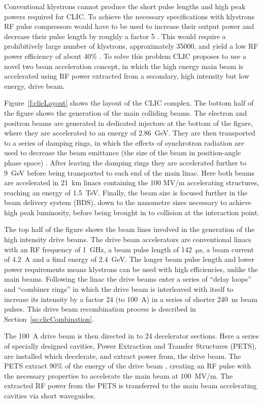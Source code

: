 Conventional klystrons cannot produce the short pulse lengths and high peak powers required for CLIC. To achieve the necessary specifications with klystrons RF pulse compressors would have to be used to increase their output power and decrease their pulse length by roughly a factor 5 \cite{clicCDR}. This would require a prohibitively large number of klystrons, approximately 35000, and yield a low RF power efficiency of about 40\% \cite{clicCDR}. To solve this problem CLIC proposes to use a novel two beam acceleration concept, in which the high energy main beam is accelerated using RF power extracted from a secondary, high intensity but low energy, drive beam.

Figure~\ref{f:clicLayout} shows the layout of the CLIC complex. The bottom half of the figure shows the generation of the main colliding beams. The electron and positron beams are generated in dedicated injectors at the bottom of the figure, where they are accelerated to an energy of 2.86~GeV. They are then transported to a series of damping rings, in which the effects of synchrotron radiation are used to decrease the beam emittance (the size of the beam in position-angle phase space) \cite{dampRings}. After leaving the damping rings they are accelerated further to 9~GeV before being transported to each end of the main linac. Here both beams are accelerated in 21~km linacs containing the 100 MV/m accelerating structures, reaching an energy of 1.5~TeV. Finally, the beam size is focused further in the beam delivery system (BDS), down to the nanometre sizes necessary to achieve high peak luminosity, before being brought in to collision at the interaction point.

The top half of the figure shows the beam lines involved in the generation of the high intensity drive beams. The drive beam accelerators are conventional linacs with an RF frequency of 1~GHz, a beam pulse length of 142~\(\mathrm{\mu s}\), a beam current of 4.2~A and a final energy of 2.4~GeV. The longer beam pulse length and lower power requirements means klystrons can be used with high efficiencies, unlike the main beams. Following the linac the drive beams enter a series of ``delay loops'' and ``combiner rings'' in which the drive beam is interleaved with itself to increase its intensity by a factor 24 (to 100~A) in a series of shorter 240~ns beam pulses. This drive beam recombination process is described in Section~\ref{ss:clicCombination}.

The 100~A drive beam is then directed in to 24 decelerator sections. Here a series of specially designed cavities, Power Extraction and Transfer Structures (PETS), are installed which decelerate, and extract power from, the drive beam. The PETS extract 90\% of the energy of the drive beam \cite{clicCDR}, creating an RF pulse with the necessary properties to accelerate the main beam at 100~MV/m. The extracted RF power from the PETS is transferred to the main beam accelerating cavities via short waveguides.



